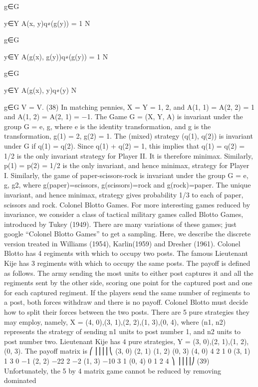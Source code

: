 \documentclass[]{report}
\begin{document}
g∈G


y∈Y
A(x, y)q∗(g(y))
= 1
N


g∈G


y∈Y
A(g(x), g(y))q∗(g(y))
= 1
N


g∈G


y∈Y
A(g(x), y)q∗(y)
N


g∈G
V = V.
(38)
In matching pennies, X = Y = {1, 2}, and A(1, 1) = A(2, 2) = 1 and A(1, 2) =
A(2, 1) = −1. The Game G = (X, Y, A) is invariant under the group G = {e, g}, where e is
the identity transformation, and g is the transformation, g(1) = 2, g(2) = 1. The (mixed)
strategy (q(1), q(2)) is invariant under G if q(1) = q(2). Since q(1) + q(2) = 1, this implies
that q(1) = q(2) = 1/2 is the only invariant strategy for Player II. It is therefore minimax.
Similarly, p(1) = p(2) = 1/2 is the only invariant, and hence minimax, strategy for Player
I.
Similarly, the game of paper-scissors-rock is invariant under the group G = {e, g, g2},
where g(paper)=scissors, g(scissors)=rock and g(rock)=paper. The unique invariant, and
hence minimax, strategy gives probability 1/3 to each of paper, scissors and rock.
Colonel Blotto Games. For more interesting games reduced by invariance, we
consider a class of tactical military games called Blotto Games, introduced by Tukey
(1949). There are many variations of these games; just google “Colonel Blotto Games”
to get a sampling. Here, we describe the discrete version treated in Williams (1954),
Karlin(1959) and Dresher (1961).
Colonel Blotto has 4 regiments with which to occupy two posts. The famous Lieutenant
Kije has 3 regiments with which to occupy the same posts. The payoff is defined as
follows. The army sending the most units to either post captures it and all the regiments
sent by the other side, scoring one point for the captured post and one for each captured
regiment. If the players send the same number of regiments to a post, both forces withdraw
and there is no payoff.
Colonel Blotto must decide how to split their forces between the two posts. There are
5 pure strategies they may employ, namely, X = {(4, 0),(3, 1),(2, 2),(1, 3),(0, 4)}, where
(n1, n2) represents the strategy of sending n1 units to post number 1, and n2 units to post
number two. Lieutenant Kije has 4 pure strategies, Y = {(3, 0),(2, 1),(1, 2),(0, 3)}. The
payoff matrix is
⎛
⎜⎜⎜⎜⎝
(3, 0) (2, 1) (1, 2) (0, 3)
(4, 0) 4 2 1 0
(3, 1) 1 3 0 −1
(2, 2) −22 2 −2
(1, 3) −10 3 1
(0, 4) 0 1 2 4
⎞
⎟⎟⎟⎟⎠
(39)
Unfortunately, the 5 by 4 matrix game cannot be reduced by removing dominated
\end{document}
